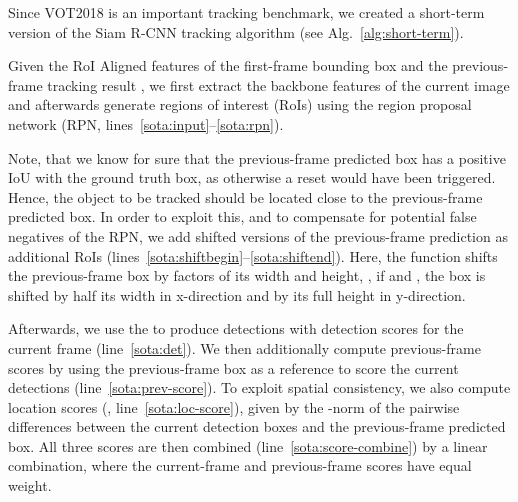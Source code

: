 \documentclass[10pt,twocolumn,letterpaper]{article}
\begin{document}
Since VOT2018 is an important tracking benchmark, we created a short-term version of the Siam R-CNN tracking algorithm (see Alg.~\ref{alg:short-term}).
Given the RoI Aligned features  of the first-frame bounding box and the previous-frame tracking result , we first extract the backbone features of the current image and afterwards generate regions of interest (RoIs) using the region proposal network (RPN, lines~\ref{sota:input}--\ref{sota:rpn}). 

Note, that we know for sure that the previous-frame predicted box  has a positive IoU with the ground truth box, as otherwise a reset would have been triggered. Hence, the object to be tracked should be located close to the previous-frame predicted box.
In order to exploit this, and to compensate for potential false negatives of the RPN, we add shifted versions of the previous-frame prediction as additional RoIs (lines~\ref{sota:shiftbegin}--\ref{sota:shiftend}). Here, the function  shifts the previous-frame box  by factors of its width and height, \eg, if  and , the box is shifted by half its width in x-direction and by its full height in y-direction.

Afterwards, we use the  to produce detections  with detection scores  for the current frame  (line~\ref{sota:det}). We then additionally compute previous-frame scores  by using the previous-frame box as a reference to score the current detections (line~\ref{sota:prev-score}). 
To exploit spatial consistency, we also compute location scores (, line~\ref{sota:loc-score}), given by the -norm of the pairwise differences between the current detection boxes and the previous-frame predicted box.
All three scores are then combined (line~\ref{sota:score-combine}) by a linear combination, where the current-frame and previous-frame scores have equal weight.
\end{document}
